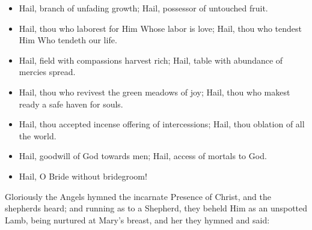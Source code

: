 \documentclass[twoside, letterpaper, 12pt]{report}
\begin{document}
\begin{itemize}[label=\tiny{+},leftmargin=*]
\item Hail, branch of unfading growth;
      Hail, possessor of untouched fruit.
\item Hail, thou who laborest for Him Whose labor is love;
      Hail, thou who tendest Him Who tendeth our life.
\item Hail, field with compassions harvest rich;
      Hail, table with abundance of mercies spread.
\item Hail, thou who revivest the green meadows of joy;
      Hail, thou who makest ready a safe haven for souls.
\item Hail, thou accepted incense offering of intercessions;
      Hail, thou oblation of all the world.
\item Hail, goodwill of God towards men;
      Hail, access of mortals to God.
\item Hail, O Bride without bridegroom!
\end{itemize}







\begin{reader}
  \item Gloriously the Angels hymned the incarnate Presence of Christ,
  and the shepherds heard; and running as to a Shepherd,
  they beheld Him as an unspotted Lamb,
  being nurtured at Mary’s breast, and her they hymned and said:
\end{reader}
\end{document}
